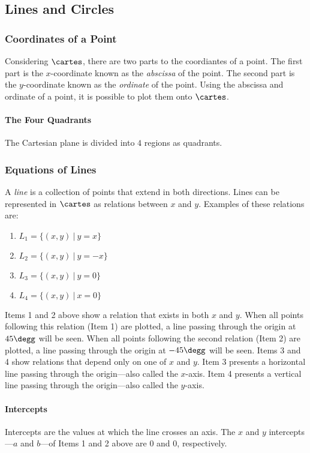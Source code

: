 \subsection{Lines and Circles}

\subsubsection{Coordinates of a Point}
Considering $\cartes$, there are two parts to the coordiantes of a point.
The first part is the $x$-coordinate known as the \emph{abscissa} of the point.
The second part is the $y$-coordinate known as the \emph{ordinate} of the point.
Using the abscissa and ordinate of a point, it is possible to plot them onto $\cartes$.

\paragraph{The Four Quadrants}
The Cartesian plane is divided into $4$ regions as quadrants.

\subsubsection{Equations of Lines}
A \emph{line} is a collection of points that extend in both directions.
Lines can be represented in $\cartes$ as relations between $x$ and $y$.
Examples of these relations are:
\begin{enumerate}
  \item $L_1 = \{(x, y)\ |\ y = x\}$
  \item $L_2 = \{(x, y)\ |\ y = -x\}$
  \item $L_3 = \{(x, y)\ |\ y = 0\}$
  \item $L_4 = \{(x, y)\ |\ x = 0\}$
\end{enumerate}

Items 1 and 2 above show a relation that exists in both $x$ and $y$.
When all points following this relation (Item 1) are plotted, a line passing through the origin at $45\degg$ will be seen.
When all points following the second relation (Item 2) are plotted, a line passing through the origin at $-45\degg$ will be seen.
Items 3 and 4 show relations that depend only on one of $x$ and $y$.
Item 3 presents a horizontal line passing through the origin---also called the \emph{$x$}-axis.
Item 4 presents a vertical line passing through the origin---also called the \emph{$y$}-axis.

\paragraph{Intercepts}
Intercepts are the values at which the line crosses an axis.
The $x$ and $y$ intercepts---$a$ and $b$---of Items 1 and 2 above are $0$ and $0$, respectively.

